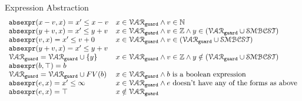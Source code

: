 \begin{defn}{Expression Abstraction}
  \[
    \begin{array}{ll} 
      \mathtt{abs}{\mathtt{expr}}(x - v, x)  = x' \leq x - v  & x \in \mathcal{VAR}_{\mathtt{guard}} \land v \in \mathbb{N} \\
      \mathtt{abs}{\mathtt{expr}}(y + v, x)  = x' \leq y + v  & x \in \mathcal{VAR}_{\mathtt{guard}} \land v \in \mathbb{Z} \land y \in (\mathcal{VAR}_{\mathtt{guard}} \cup \mathcal{SMBCST}) \\
      \mathtt{abs}{\mathtt{expr}}(v, x)  = x' \leq v + 0  & x \in \mathcal{VAR}_{\mathtt{guard}} \land v \in (\mathcal{VAR}_{\mathtt{guard}} \cup \mathcal{SMBCST}) \\
      \mathtt{abs}{\mathtt{expr}}(y + v, x)  = x' \leq y + v & \\
      \mathcal{VAR}_{\mathtt{guard}} = \mathcal{VAR}_{\mathtt{guard}} \cup \{y\} & x \in \mathcal{VAR}_{\mathtt{guard}} \land v \in \mathbb{Z} \land y \notin (\mathcal{VAR}_{\mathtt{guard}} \cup \mathcal{SMBCST})  \\
      \mathtt{abs}{\mathtt{expr}}(b, \top) = b   & \\
      \mathcal{VAR}_{\mathtt{guard}} = \mathcal{VAR}_{\mathtt{guard}} \cup FV(b) &  x \in \mathcal{VAR}_{\mathtt{guard}} \land b \text{ is a boolean expression} \\
      \mathtt{abs}{\mathtt{expr}}(e, x) = x' \leq \infty  &  x \in \mathcal{VAR}_{\mathtt{guard}} \land e \text{ doesn't have any of the forms as above} \\
      \mathtt{abs}{\mathtt{expr}}(e, x) = \top  &  x \notin \mathcal{VAR}_{\mathtt{guard}} \\
    \end{array}
    \]
  \end{defn}
  
